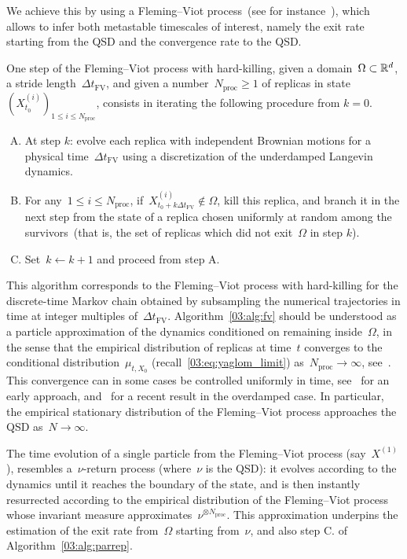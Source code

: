 We achieve this by using a Fleming--Viot process~(see for instance~\cite{DMM00}), which allows to infer both metastable timescales of interest, namely the exit rate starting from the QSD and the convergence rate to the QSD. 

\begin{algorithm}
    \label{03:alg:fv}
    One step of the Fleming--Viot process with hard-killing, given a domain~$\Omega\subset\mathbb{R}^d$, a stride length~$\Delta t_{\mathrm{FV}}$, and given a number~$N_{\mathrm{proc}}\geq 1$ of replicas in state $(X_{t_0}^{(i)})_{1\leq i\leq N_{\mathrm{proc}}}$, consists in iterating the following procedure from $k=0$.
    \begin{enumerate}[A.]
        \item{At step $k$: evolve each replica with independent Brownian motions for a physical time~$\Delta t_{\mathrm{FV}}$ using a discretization of the underdamped Langevin dynamics.}
        \item{For any~$1\leq i\leq N_{\mathrm{proc}}$, if~$X_{t_0 + k\Delta t_{\mathrm{FV}}}^{(i)}\not\in\Omega$, kill this replica, and branch it in the next step from the state of a replica chosen uniformly at random among the survivors~(that is, the set of replicas which did not exit~$\Omega$ in step $k$).}
        \item{Set~$k\leftarrow k+1$ and proceed from step A.}
    \end{enumerate}
\end{algorithm}
This algorithm corresponds to the Fleming--Viot process with hard-killing for the discrete-time Markov chain obtained by subsampling the numerical trajectories in time at integer multiples of~$\Delta t_{\mathrm{FV}}$.
Algorithm~\ref{03:alg:fv} should be understood as a particle approximation of the dynamics conditioned on remaining inside~$\Omega$, in the sense that the empirical distribution of replicas at time~$t$ converges to the conditional distribution~$\mu_{t,X_0}$ (recall~\eqref{03:eq:yaglom_limit}) as~$N_{\mathrm{proc}}\to \infty$, see~\cite[Theorem 2.2]{V14}. This convergence can in some cases be controlled uniformly in time, see~\cite[Theorem 3.1]{R06} for an early approach, and~\cite[Theorem 2]{JM22} for a recent result in the overdamped case.
In particular, the empirical stationary distribution of the Fleming--Viot process approaches the QSD as~$N\to\infty$.

The time evolution of a single particle from the Fleming--Viot process (say~$X^{(1)}$), resembles a~$\nu$-return process (where~$\nu$ is the QSD): it evolves according to the dynamics until it reaches the boundary of the state, and is then instantly resurrected according to the empirical distribution of the Fleming--Viot process whose invariant measure approximates~$\nu^{\otimes N_{\mathrm{proc}}}$.
This approximation underpins the estimation of the exit rate from~$\Omega$ starting from~$\nu$, and also step C. of Algorithm~\ref{03:alg:parrep}.

